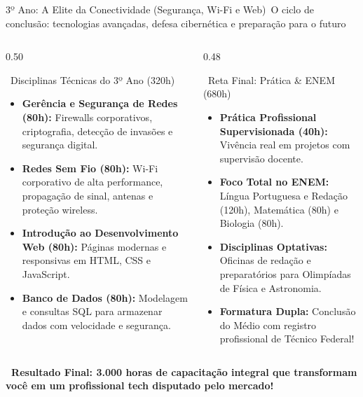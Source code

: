 \begin{frame}{3º Ano: A Elite da Conectividade (Segurança, Wi-Fi e Web)}{\faUserShield\ O ciclo de conclusão: tecnologias avançadas, defesa cibernética e preparação para o futuro}
  \begin{columns}[t]
    \begin{column}{0.50\textwidth}
      \begin{purplecard}{\faLock\ Disciplinas Técnicas do 3º Ano (320h)}
        \tiny
        \begin{itemize}\setlength{\itemsep}{0.15em}
          \item \textbf{Gerência e Segurança de Redes (80h):} Firewalls corporativos, criptografia, detecção de invasões e segurança digital.
          \item \textbf{Redes Sem Fio (80h):} Wi-Fi corporativo de alta performance, propagação de sinal, antenas e proteção wireless.
          \item \textbf{Introdução ao Desenvolvimento Web (80h):} Páginas modernas e responsivas em HTML, CSS e JavaScript.
          \item \textbf{Banco de Dados (80h):} Modelagem e consultas SQL para armazenar dados com velocidade e segurança.
        \end{itemize}
      \end{purplecard}
    \end{column}
    
    \begin{column}{0.48\textwidth}
      \begin{redcard}{\faMedal\ Reta Final: Prática \& ENEM (680h)}
        \tiny
        \begin{itemize}\setlength{\itemsep}{0.15em}
          \item \textbf{Prática Profissional Supervisionada (40h):} Vivência real em projetos com supervisão docente.
          \item \textbf{Foco Total no ENEM:} Língua Portuguesa e Redação (120h), Matemática (80h) e Biologia (80h).
          \item \textbf{Disciplinas Optativas:} Oficinas de redação e preparatórios para Olimpíadas de Física e Astronomia.
          \item \textbf{Formatura Dupla:} Conclusão do Médio com registro profissional de Técnico Federal!
        \end{itemize}
      \end{redcard}
    \end{column}
  \end{columns}
  
  \vspace{0.06cm}
  \begin{center}
    \tiny \textcolor{IFCEDarkGreen}{\textbf{\faTrophy\ Resultado Final: 3.000 horas de capacitação integral que transformam você em um profissional tech disputado pelo mercado!}}
  \end{center}
\end{frame}
